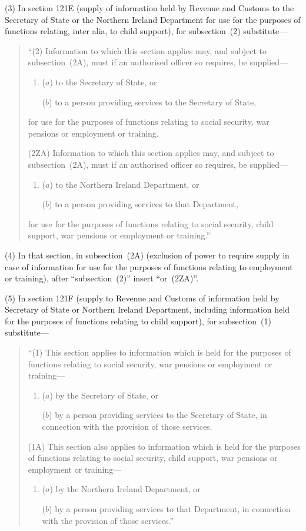 \documentclass[12pt,a4paper]{article}
\begin{document}
(3) In section 121E (supply of information held by Revenue and Customs to the Secretary of State or the Northern Ireland Department for use for the purposes of functions relating, inter alia, to child support), for subsection~(2) substitute—
\begin{quotation}
“(2) Information to which this section applies may, and subject to subsection~(2A), must if an authorised officer so requires, be supplied—
\begin{enumerate}\item[]
($a$) to the Secretary of State, or

($b$) to a person providing services to the Secretary of State,
\end{enumerate}
for use for the purposes of functions relating to social security, war pensions or employment or training.

(2ZA) Information to which this section applies may, and subject to subsection~(2A), must if an authorised officer so requires, be supplied—
\begin{enumerate}\item[]
($a$) to the Northern Ireland Department, or

($b$) to a person providing services to that Department,
\end{enumerate}
for use for the purposes of functions relating to social security, child support, war pensions or employment or training.”
\end{quotation}

(4) In that section, in subsection~(2A) (exclusion of power to require supply in case of information for use for the purposes of functions relating to employment or training), after “subsection~(2)” insert  “or~(2ZA)”.

(5) In section 121F (supply to Revenue and Customs of information held by Secretary of State or Northern Ireland Department, including information held for the purposes of functions relating to child support), for subsection~(1) substitute—
\begin{quotation}
“(1) This section applies to information which is held for the purposes of functions relating to social security, war pensions or employment or training—
\begin{enumerate}\item[]
($a$) by the Secretary of State, or

($b$) by a person providing services to the Secretary of State, in connection with the provision of those services.
\end{enumerate}

(1A) This section also applies to information which is held for the purposes of functions relating to social security, child support, war pensions or employment or training—
\begin{enumerate}\item[]
($a$) by the Northern Ireland Department, or

($b$) by a person providing services to that Department, in connection with the provision of 
those services.”
\end{enumerate}
\end{quotation}
\end{document}
